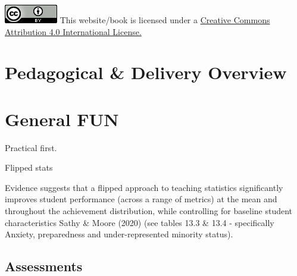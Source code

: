 \documentclass[
  11pt,
  letterpaper,
  oneside,
  open=any]{scrbook}
\begin{document}
\href{http://creativecommons.org/licenses/by/4.0/}{\includegraphics{images/creative_commons.png}}
This website/book is licensed under a
\href{http://creativecommons.org/licenses/by/4.0/}{Creative Commons
Attribution 4.0 International License.}


\hypertarget{pedagogical-delivery-overview}{%
\chapter{Pedagogical \& Delivery
Overview}\label{pedagogical-delivery-overview}}


\hypertarget{general-fun}{%
\chapter{General FUN}\label{general-fun}}

Practical first.

Flipped stats

Evidence suggests that a flipped approach to teaching statistics
significantly improves student performance (across a range of metrics)
at the mean and throughout the achievement distribution, while
controlling for baseline student characteristics Sathy \& Moore (2020)
(see tables 13.3 \& 13.4 - specifically Anxiety, preparedness and
under-represented minority status).

\hypertarget{assessments}{%
\section{Assessments}\label{assessments}}
\end{document}
